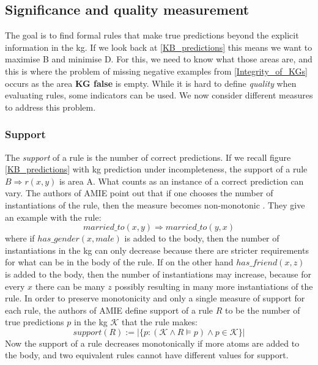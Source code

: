 \subsection{Significance and quality measurement}
\label{significance_and_quality}
The goal is to find formal rules that make true predictions beyond the explicit information in the \gls{kg}. If we look back at \cref{KB_predictions} this means we want to maximise B and minimise D. For this, we need to know what those areas are, and this is where the problem of missing negative examples from \cref{Integrity_of_KGs} occurs as the area \textbf{KG false} is empty. While it is hard to define \textit{quality} when evaluating rules, some indicators can be used. We now consider different measures to address this problem.

\subsubsection{Support}
The \textit{support} of a rule is the number of correct predictions. If we recall figure \cref{KB_predictions} with \gls{kg} prediction under incompleteness, the support of a rule $B \Rightarrow r(x,y)$ is area A. What counts as an instance of a correct prediction can vary. The authors of AMIE point out that if one chooses the number of instantiations of the rule, then the measure becomes non-monotonic \cite{amie3}. They give an example with the rule:
\[married\_to(x, y) \Rightarrow married\_to(y, x)\]
where if $has\_gender(x, male)$ is added to the body, then the number of instantiations in the \gls{kg} can only decrease because there are stricter requirements for what can be in the body of the rule. If on the other hand $has\_friend(x, z)$ is added to the body, then the number of instantiations may increase, because for every $x$ there can be many $z$ possibly resulting in many more instantiations of the rule. In order to preserve monotonicity and only a single measure of support for each rule, the authors of AMIE define support of a rule $R$ to be the number of true predictions $p$ in the \gls{kg} $\mathcal{K}$ that the rule makes:
\[support(R) :=  | \{p : (\mathcal{K} \wedge R \models p)\wedge p \in \mathcal{K} \}|\]
Now the support of a rule decreases monotonically if more atoms are added to the body, and two equivalent rules cannot have different values for support.

